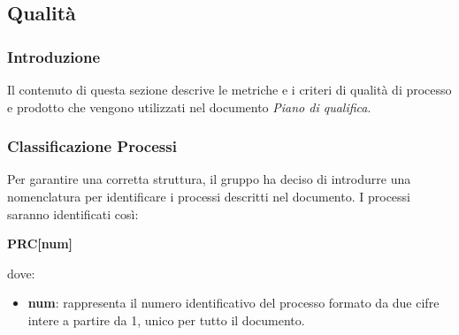 \subsection{Qualità} \label{qualita}

\subsubsection{Introduzione}
Il contenuto di questa sezione descrive le metriche e i criteri di qualità di processo e prodotto che vengono utilizzati nel documento \textit{Piano di qualifica}.

\subsubsection{Classificazione Processi}
Per garantire una corretta struttura, il gruppo ha deciso di introdurre una nomenclatura per identificare i processi descritti nel documento. I processi saranno identificati così:
\begin{center}
	\textbf{PRC[num]}
\end{center}
dove:
\begin{itemize}
	\item \textbf{num}: rappresenta il numero identificativo del processo formato da due cifre intere a partire da 1, unico per tutto il documento.
\end{itemize}

